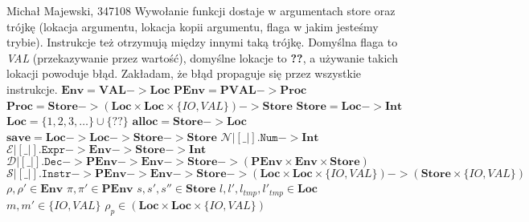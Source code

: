 \documentclass[12pt]{minimal}
\begin{document}
Michał Majewski, 347108
\newline
Wywołanie funkcji dostaje w argumentach store oraz trójkę (lokacja argumentu, lokacja kopii argumentu, flaga w jakim jesteśmy trybie). Instrukcje też otrzymują między innymi taką trójkę. Domyślna flaga to \textit{VAL} (przekazywanie przez wartość), domyślne lokacje to \textbf{??}, a używanie takich lokacji powoduje błąd. Zakładam, że błąd propaguje się przez wszystkie instrukcje.
\newline
\newline
%
%
$\textbf{Env} = \textbf{VAL} -> \textbf{Loc}$ \newline
$\textbf{PEnv} = \textbf{PVAL} -> \textbf{Proc}$ \newline
$\textbf{Proc} = \textbf{Store} -> (\textbf{Loc} \times \textbf{Loc} \times \{\textit{IO}, \textit{VAL}\}) -> \textbf{Store}$ \newline
$\textbf{Store} = \textbf{Loc} -> \textbf{Int}$ \newline
$\textbf{Loc} = \{1, 2, 3, \ldots \} \cup \{\textbf{??}\}$ \newline
$\textbf{alloc} = \textbf{Store} -> \textbf{Loc}$ \newline
$\textbf{save} = \textbf{Loc} -> \textbf{Loc} -> \textbf{Store} -> \textbf{Store}$ \newline
\newline
%
%
$\mathcal{N}|[\_|].\texttt{Num} -> \textbf{Int}$ \newline
$\mathcal{E}|[\_|].\texttt{Expr} -> \textbf{Env} -> \textbf{Store} -> \textbf{Int}$ \newline
$\mathcal{D}|[\_|].\texttt{Dec} -> \textbf{PEnv} -> \textbf{Env} -> \textbf{Store} -> (\textbf{PEnv} \times \textbf{Env} \times \textbf{Store})$ \newline
$\mathcal{S}|[\_|].\texttt{Instr} -> \textbf{PEnv} -> \textbf{Env} -> \textbf{Store} -> (\textbf{Loc} \times \textbf{Loc} \times \{\textit{IO}, \textit{VAL}\}) -> (\textbf{Store} \times \{\textit{IO}, \textit{VAL}\})$ \newline
\newline
%
%
$\rho, \rho' \in \textbf{Env}$\newline
$\pi, \pi' \in \textbf{PEnv}$\newline
$s, s', s'' \in \textbf{Store}$\newline
$l, l', l_{tmp}, l'_{tmp} \in \textbf{Loc}$\newline
$m, m' \in \{\textit{IO}, \textit{VAL}\}$\newline
$\rho_p \in (\textbf{Loc} \times \textbf{Loc} \times \{\textit{IO}, \textit{VAL}\})$\newline
\end{document}

